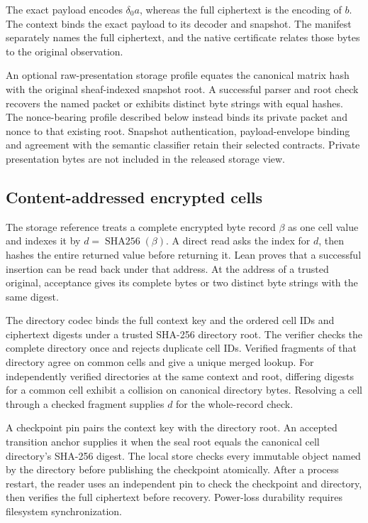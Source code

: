 The exact payload encodes \(\delta_0a\), whereas the full ciphertext is
the encoding of \(b\). The context binds the exact payload to its decoder
and snapshot. The manifest separately names the full ciphertext, and the
native certificate relates those bytes to the original observation.

An optional raw-presentation storage profile equates the canonical matrix
hash with the original sheaf-indexed snapshot root. A successful parser and
root check recovers the named packet or exhibits distinct byte strings with
equal hashes. The nonce-bearing profile described below instead binds its
private packet and nonce to that existing root. Snapshot authentication,
payload-envelope binding and agreement with the semantic classifier retain
their selected contracts. Private presentation bytes are not included in the
released storage view.

\subsection{Content-addressed encrypted cells}

The storage reference treats a complete encrypted byte record \(\beta\)
as one cell value and indexes it by \(d=\operatorname{SHA256}(\beta)\).
A direct read asks the index for \(d\), then hashes the entire returned
value before returning it. Lean proves that a successful insertion
can be read back under that address. At the address of a trusted original,
acceptance gives its complete bytes or two distinct byte strings with the
same digest.

The directory codec binds the full context key and the ordered cell IDs
and ciphertext digests under a trusted SHA-256 directory root. The verifier
checks the complete directory once and rejects duplicate cell IDs. Verified
fragments of that directory agree on common cells and give a unique merged
lookup. For independently verified directories at the same context and
root, differing digests for a common cell exhibit a collision on canonical
directory bytes. Resolving a cell through a checked fragment supplies \(d\)
for the whole-record check.

A checkpoint pin pairs the context key with the directory root. An accepted
transition anchor supplies it when the seal root equals the canonical cell
directory's SHA-256 digest. The local store checks every immutable object
named by the directory before publishing the checkpoint atomically. After
a process restart, the reader uses an independent pin to check the checkpoint
and directory, then verifies the full ciphertext before recovery. Power-loss
durability requires filesystem synchronization.

